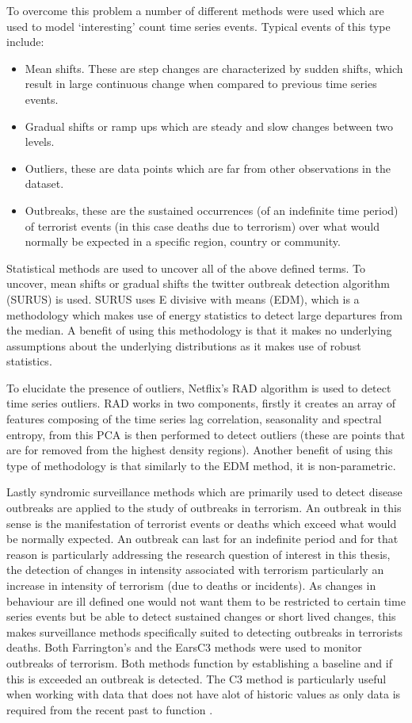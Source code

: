To overcome this problem a number of different methods were used which are used to model ‘interesting’ count time series events. Typical events of this type include:
\begin{itemize}
\item Mean shifts. These are step changes are characterized by sudden shifts, which result in large continuous change when compared to previous time series events.
\item Gradual shifts or ramp ups which are steady and slow changes between two levels.
\item Outliers, these are data points which are far from other observations in the dataset.
\item Outbreaks, these are the sustained occurrences (of an indefinite time period) of terrorist events (in this case deaths due to terrorism) over what would normally be expected in a specific region, country or community.
\end{itemize}

Statistical methods are used to uncover all of the above defined terms.  To uncover, mean shifts or gradual shifts the twitter outbreak detection algorithm (SURUS) is used. SURUS uses E divisive with  means (EDM), which is a methodology which makes use of energy statistics to detect large departures from the median. A benefit of using this methodology is that it makes no underlying assumptions about the underlying distributions as it makes use of robust statistics. 

To elucidate the presence of outliers,  Netflix’s RAD \citep{pylypenkocognitive} algorithm is used to detect time series outliers.  RAD works in two components, firstly it creates an array of features composing of the time series lag correlation, seasonality and spectral entropy, from this PCA is then performed to detect outliers (these are points that are for removed from the highest density regions). Another benefit of using this type of methodology is that similarly to the EDM method, it is non-parametric.

Lastly syndromic surveillance methods which are primarily used to detect disease outbreaks are applied to the study of outbreaks in terrorism. An outbreak in this sense is the manifestation of terrorist events or deaths which exceed what would be normally expected. An outbreak can last for an indefinite period and for that reason is particularly addressing the research question of interest in this thesis, the detection of changes in intensity associated with terrorism particularly an increase in intensity of terrorism (due to deaths or incidents). As changes in behaviour are ill defined one would not want them to be restricted to certain time series events but be able to detect sustained changes or short lived changes, this makes surveillance methods specifically suited to detecting outbreaks in terrorists deaths. Both Farrington’s and the EarsC3 methods were used to monitor outbreaks of terrorism. Both methods function by establishing a baseline and if this is exceeded an outbreak is detected. The C3 method is particularly useful when working with data that does not have alot of historic values as only data is required from the recent past to function \citep{stacey2007comparison}. 

